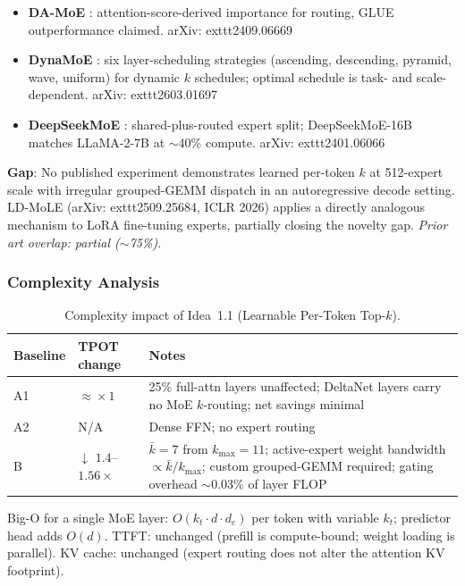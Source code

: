 \documentclass[11pt]{article}
\begin{document}
\begin{itemize}
  \item \textbf{DA-MoE} \cite{AkhavanAghdamEtAl2024}: attention-score-derived importance for routing, GLUE outperformance claimed.
    arXiv:	exttt{2409.06669}

  \item \textbf{DynaMoE} \cite{Gulmez2026}: six layer-scheduling strategies (ascending, descending, pyramid, wave, uniform) for dynamic $k$ schedules; optimal schedule is task- and scale-dependent.
    arXiv:	exttt{2603.01697}

  \item \textbf{DeepSeekMoE} \cite{DaiDengEtAl2024}: shared-plus-routed expert split; DeepSeekMoE-16B matches LLaMA-2-7B at $\sim$40\% compute.
    arXiv:	exttt{2401.06066}
\end{itemize}

\noindent\textbf{Gap}: No published experiment demonstrates learned per-token $k$ at 512-expert scale with irregular grouped-GEMM dispatch in an autoregressive decode setting.
LD-MoLE \cite{ZhuangEtAl2026} (arXiv:	exttt{2509.25684}, ICLR 2026) applies a directly analogous mechanism to LoRA fine-tuning experts, partially closing the novelty gap.
\emph{Prior art overlap: partial ($\sim$75\%).}

\subsubsection*{Complexity Analysis}

\begin{table}[h]
\centering
\caption{Complexity impact of Idea~1.1 (Learnable Per-Token Top-$k$).}
\label{tab:complexity-1-1}
\begin{tabular}{llp{7cm}}
\toprule
\textbf{Baseline} & \textbf{TPOT change} & \textbf{Notes} \\
\midrule
A1 & $\approx\!\times 1$ & 25\% full-attn layers unaffected; DeltaNet layers carry no MoE $k$-routing; net savings minimal \\
A2 & N/A & Dense FFN; no expert routing \\
B  & $\downarrow$ $1.4$--$1.56\times$ & $\bar{k}=7$ from $k_{\max}=11$; active-expert weight bandwidth $\propto \bar{k}/k_{\max}$; custom grouped-GEMM required; gating overhead $\sim$0.03\% of layer FLOP \\
\bottomrule
\end{tabular}
\end{table}

\noindent
Big-O for a single MoE layer: $O(k_t \cdot d \cdot d_e)$ per token with variable $k_t$; predictor head adds $O(d)$.
TTFT: unchanged (prefill is compute-bound; weight loading is parallel).
KV cache: unchanged (expert routing does not alter the attention KV footprint).
\end{document}
